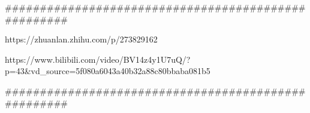 
####################################################


https://zhuanlan.zhihu.com/p/273829162

https://www.bilibili.com/video/BV14z4y1U7uQ/?p=43&vd_source=5f080a6043a40b32a88c80bbaba081b5


####################################################

